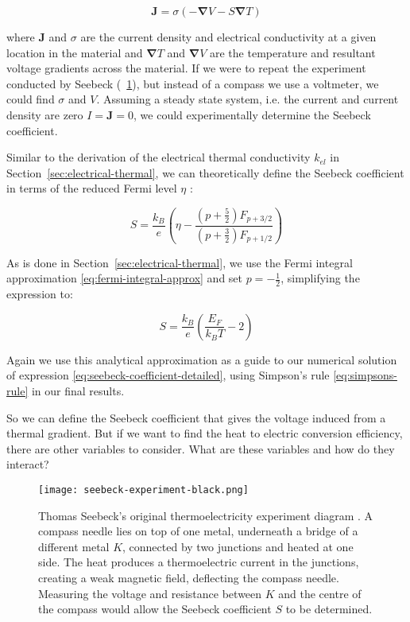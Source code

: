 \documentclass[12pt]{article}
\newcommand{\figref}[2][\figurename~]{#1\ref{#2}}
\newcommand{\secref}[2][Section~]{#1\ref{#2}}
\renewcommand{\vec}[1]{\mathbf{#1}}
\begin{document}
\begin{equation}
\label{current-density}
	\vec{J} = \sigma (-\vec{\nabla} V - S \vec{\nabla} T)
\end{equation}

where $\vec{J}$ and $\sigma$ are the current density and electrical conductivity at a given location in the material and $\vec{\nabla} T$ and $\vec{\nabla} V$ are the temperature and resultant voltage gradients across the material. If we were to repeat the experiment conducted by Seebeck (\figref{fig:seebeck-experiment}), but instead of a compass we use a voltmeter, we could find $\sigma$ and $V$. Assuming a steady state system, i.e. the current and current density are zero $I = \vec{J} = 0$, we could experimentally determine the Seebeck coefficient.

Similar to the derivation of the electrical thermal conductivity $k_{el}$ in \secref{sec:electrical-thermal}, we can theoretically define the Seebeck coefficient in terms of the reduced Fermi level $\eta$ \cite{drabble}:

\begin{equation}
\label{eq:seebeck-coefficient-detailed}
	S = \frac{k_B}{e}\left(\eta - \frac{(p+\frac{5}{2})F_{p+3/2}}{(p+\frac{3}{2})F_{p+1/2}}\right)
\end{equation}

As is done in \secref{sec:electrical-thermal}, we use the Fermi integral approximation \eqref{eq:fermi-integral-approx} and set $p = -\frac{1}{2}$, simplifying the expression to:

\begin{equation}
\label{eq:seebeck-coefficient}
	S = \frac{k_B}{e} \left(\frac{E_F}{k_B T} - 2 \right)
\end{equation}

Again we use this analytical approximation as a guide to our numerical solution of expression \eqref{eq:seebeck-coefficient-detailed}, using Simpson's rule \eqref{eq:simpsons-rule} in our final results.

So we can define the Seebeck coefficient that gives the voltage induced from a thermal gradient. But if we want to find the heat to electric conversion efficiency, there are other variables to consider. What are these variables and how do they interact? 

\begin{figure}
	\centering
	\texttt{[image: seebeck-experiment-black.png]}
	\caption{Thomas Seebeck's original thermoelectricity experiment diagram \cite{seebeck-original}. A compass needle lies on top of one metal, underneath a bridge of a different metal $K$, connected by two junctions and heated at one side. The heat produces a thermoelectric current in the junctions, creating a weak magnetic field, deflecting the compass needle. Measuring the voltage and resistance between $K$ and the centre of the compass would allow the Seebeck coefficient $S$ to be determined.}
	\label{fig:seebeck-experiment}
\end{figure}
\end{document}
